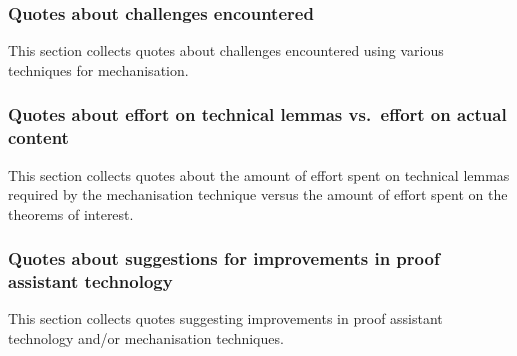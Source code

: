 \subsubsection{Quotes about challenges encountered}
This section collects quotes about challenges encountered using various techniques for mechanisation.

\subsubsection{Quotes about effort on technical lemmas vs.\ effort on actual content}
This section collects quotes about the amount of effort spent on technical lemmas required by the mechanisation technique versus the amount of effort spent on the theorems of interest.

\subsubsection{Quotes about suggestions for improvements in proof assistant technology}
This section collects quotes suggesting improvements in proof assistant technology and/or mechanisation techniques.
